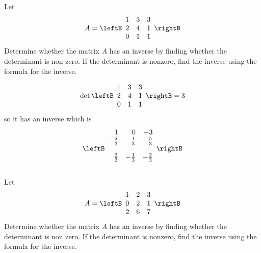 \begin{enumialphparenastyle}
\begin{ex} Let
\begin{equation*}
A=
\leftB
\begin{array}{rrr}
1 & 3 & 3 \\
2 & 4 & 1 \\
0 & 1 & 1
\end{array}
\rightB
\end{equation*}
Determine whether the matrix $A$ has an inverse by finding whether the
determinant is non zero. If the determinant is nonzero, find the inverse
using the formula for the inverse.
\begin{sol}
\[
\det \leftB
\begin{array}{ccc}
1 & 3 & 3 \\
2 & 4 & 1 \\
0 & 1 & 1
\end{array}
\rightB = 3
\]
so it has an inverse which is
\[
\leftB
\begin{array}{rrr}
1 & 0 & -3 \\
-\vspace{0.05in}\frac{2}{3} & \vspace{0.05in}\frac{1}{3} & \vspace{0.05in}\frac{5}{3} \\
\vspace{0.05in}\frac{2}{3} & -\vspace{0.05in}\frac{1}{3} & -\vspace{0.05in}\frac{2}{3}
\end{array}
\rightB
\]
\end{sol}
\end{ex}

\begin{ex} Let 
\begin{equation*}
A = 
\leftB
\begin{array}{rrr}
1 & 2 & 3 \\
0 & 2 & 1 \\
2 & 6 & 7
\end{array}
\rightB
\end{equation*}
Determine whether the matrix $A$ has an inverse by finding whether the
determinant is non zero. If the determinant is nonzero, find the inverse
using the formula for the inverse.
\end{ex}



\end{enumialphparenastyle}
